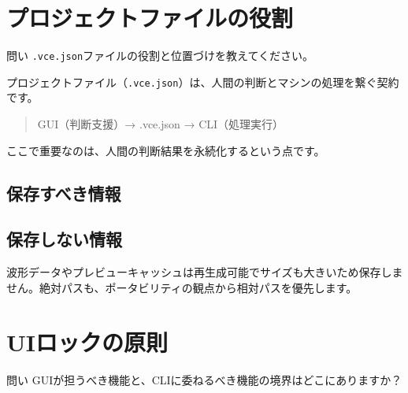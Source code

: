 \documentclass[10pt,a4paper,twocolumn]{ltjsarticle}
\begin{document}
\section{プロジェクトファイルの役割}

\begin{itembox}[l]{問い}
\texttt{.vce.json}ファイルの役割と位置づけを教えてください。
\end{itembox}

プロジェクトファイル（\texttt{.vce.json}）は、人間の判断とマシンの処理を繋ぐ契約です。

\begin{quote}
GUI（判断支援）→ .vce.json → CLI（処理実行）
\end{quote}

ここで重要なのは、人間の判断結果を永続化するという点です。

\subsection{保存すべき情報}

\vspace{0.5\baselineskip}
\vspace{0.5\baselineskip}

\subsection{保存しない情報}

波形データやプレビューキャッシュは再生成可能でサイズも大きいため保存しません。絶対パスも、ポータビリティの観点から相対パスを優先します。

\section{UIロックの原則}

\begin{itembox}[l]{問い}
GUIが担うべき機能と、CLIに委ねるべき機能の境界はどこにありますか？
\end{itembox}
\end{document}
